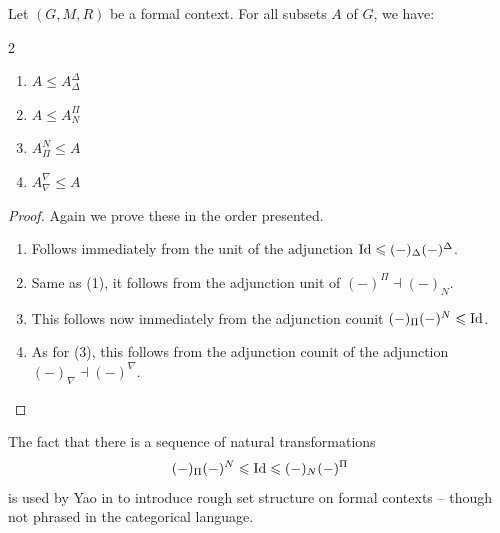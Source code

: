 \begin{proposition}
    \label{prop:closure-interior}
    Let $(G,M,R)$ be a formal context. For all subsets $A$ of $G$, we have: 
    \begin{multicols}{2}
    \begin{enumerate}
        \item $A\leq A^\Delta_\Delta$
        \item $A\leq A^\Pi_N$
        \item $A^N_\Pi \leq A$
        \item $A^\nabla_\nabla \leq A$
    \end{enumerate}
    \end{multicols}
\end{proposition}
\begin{proof}
    Again we prove these in the order presented. 
    \begin{enumerate}
        \item Follows immediately from the unit of the adjunction $\mathrm{Id} \leqslant (-)_\Delta (-)^\Delta$. 
        \item Same as (1), it follows from the adjunction unit of $(-)^\Pi \dashv (-)_N$. 
        \item This follows now immediately from the adjunction counit $(-)_\Pi (-)^N \leqslant \mathrm{Id}$. 
        \item As for (3), this follows from the adjunction counit of the adjunction $(-)_\nabla \dashv (-)^\nabla$. 
    \end{enumerate}
\end{proof}

\begin{remark}
    The fact that there is a sequence of natural transformations
    \[(-)_\Pi (-)^N \leqslant \mathrm{Id} \leqslant (-)_N (-)^\Pi\]
    is used by Yao in \cite{yao_2004} to introduce rough set structure on formal contexts -- though not phrased in the categorical language. 
\end{remark}


 




